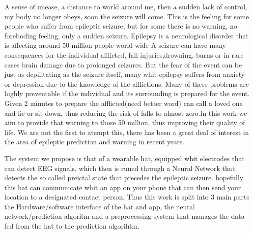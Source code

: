 A sense of unease, a distance to world around me, then a sudden lack of control, my body no longer obeys, soon the seizure will come. This is the feeling for some people who suffer from epileptic seizure, but for some there is no warning, no foreboding feeling, only a sudden seizure. Epilepsy is a neurological disorder that is affecting around 50 million people world wide 
A seizure can have many consequences for the individual afflicted, fall injuries,drowning, burns or in rare cases brain damage due to prolonged seizures. But the fear of the event can be just as depilitating as the seizure itself, many whit epilepsy suffers from anxiety or depression due to the knowledge of the afflictions. Many of these problems are highly preventable if the individual and its surrounding is prepared for the event. Given 2 minutes to prepare the afflicted(need better word) can call a loved one and lie or sit down, thus reducing the risk of falls to almost zero.In this work we aim to provide that warning to those 50 million, thus improving their quality of life. We are not the first to atempt this, there has been a great deal of interest in the area of epileptic prediction and warning in recent years. 


The system we propose is that of a wearable hat, equipped whit electrodes that can detect EEG signals, which then is runed through a Neural Network that detects the so called preictal state that precedes the epileptic seizure. hopefully this hat can communicate whit an app on your phone that can then send your location to a designated contact person. Thus this work is split into 3 main parts the Hardware/software interface of the hat and app, the neural network/prediction algoritm and a preprocessing system that manages the data fed from the hat to the prediction algorihtm.








